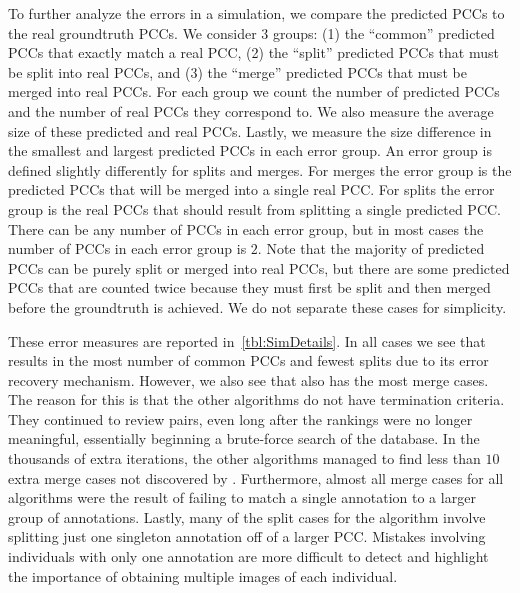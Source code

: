     To further analyze the errors in a simulation, we compare the predicted PCCs to the real groundtruth PCCs.
    We consider $3$ groups:
    (1) the ``common'' predicted PCCs that exactly match a real PCC,
    (2) the ``split'' predicted PCCs that must be split into real PCCs, and
    (3) the ``merge'' predicted PCCs that must be merged into real PCCs.
    For each group we count the number of predicted PCCs and the number of real PCCs they correspond to.
    We also measure the average size of these predicted and real PCCs.
    Lastly, we measure the size difference in the smallest and largest predicted PCCs in each error group.
    An error group is defined slightly differently for splits and merges.
    For merges the error group is the predicted PCCs that will be merged into a single real PCC.
    For splits the error group is the real PCCs that should result from splitting a single predicted PCC.
    There can be any number of PCCs in each error group, but in most cases the number of PCCs in each error group
      is $2$.
    Note that the majority of predicted PCCs can be purely split or merged into real PCCs, but there are some
      predicted PCCs that are counted twice because they must first be split and then merged before the
      groundtruth is achieved.
    We do not separate these cases for simplicity.

    These error measures are reported in~\cref{tbl:SimDetails}.
    In all cases we see that  results in the most number of common PCCs and fewest splits due to its
      error recovery mechanism.
    However, we also see that  also has the most merge cases.
    The reason for this is that the other algorithms do not have termination criteria.
    They continued to review pairs, even long after the rankings were no longer meaningful, essentially beginning
      a brute-force search of the database.
    In the thousands of extra iterations, the other algorithms managed to find less than $10$ extra merge cases
      not discovered by .
    Furthermore, almost all merge cases for all algorithms were the result of failing to match a single
      annotation to a larger group of annotations.
    Lastly, many of the split cases for the  algorithm involve splitting just one singleton
      annotation off of a larger PCC.
    Mistakes involving individuals with only one annotation are more difficult to detect and highlight the
      importance of obtaining multiple images of each individual.

    \SimDetails{}

